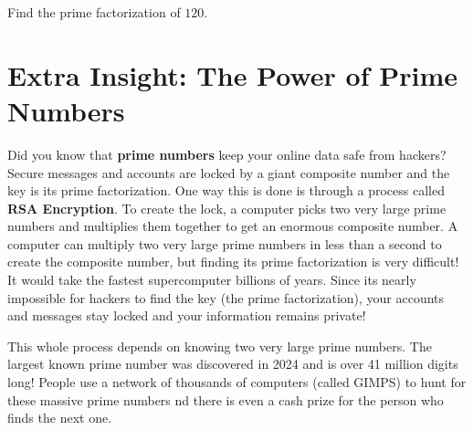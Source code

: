 \documentclass{ximera}[font=12pt]  %
\begin{document}
\begin{problem}
  Find the prime factorization of $120.$

  \begin{multipleChoice}
  \end{multipleChoice}


\end{problem}

\section*{Extra Insight:  The Power of Prime Numbers}

Did you know that \textbf{prime numbers} keep your online data safe from hackers?  Secure messages and accounts are locked by 
a giant composite number and the key is its prime factorization.  One way this is done is through a process called \textbf{RSA Encryption}.  
To create the lock, a computer picks two very large prime numbers and multiplies them together to get an enormous composite number.  
A computer can multiply two very large prime numbers in less than a second to create the composite number, but finding its prime 
factorization is very difficult!  It would take the fastest supercomputer billions of years.  Since its nearly impossible for hackers 
to find the key (the prime factorization), your accounts and messages stay locked and your information remains private!

This whole process depends on knowing two very large prime numbers. The largest known prime number was discovered in 2024 and is 
over 41 million digits long! People use a network of thousands of computers (called GIMPS) to hunt for these massive prime numbers 
nd there is even a cash prize for the person who finds the next one.
\end{document}
